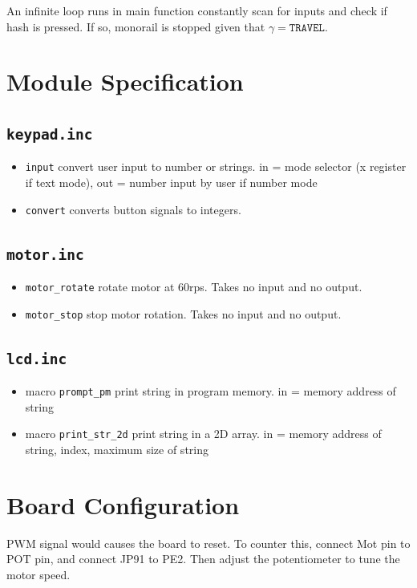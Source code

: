\documentclass[a4paper,12pt]{article}
\begin{document}
An infinite loop runs in main function constantly scan for inputs and check if hash is pressed. If so, monorail is stopped given that $\gamma = \texttt{TRAVEL}$.

\section{Module Specification}
\subsection{\texttt{keypad.inc}}
\begin{itemize}
    \item \texttt{input} convert user input to number or strings. in = mode selector (x register if text mode), out = number input by user if number mode
    \item \texttt{convert} converts button signals to integers.
\end{itemize}
\subsection{\texttt{motor.inc}}
\begin{itemize}
    \item \texttt{motor\_rotate} rotate motor at 60rps. Takes no input and no output.
    \item \texttt{motor\_stop} stop motor rotation. Takes no input and no output.
\end{itemize}
\subsection{\texttt{lcd.inc}}
\begin{itemize}
    \item macro \texttt{prompt\_pm} print string in program memory. in = memory address of string
    \item macro \texttt{print\_str\_2d} print string in a 2D array. in = memory address of string, index, maximum size of string 
\end{itemize}

\section{Board Configuration}
PWM signal would causes the board to reset. To counter this, connect Mot pin to POT pin, and connect JP91 to PE2. Then adjust the potentiometer to tune the motor speed.
\end{document}
